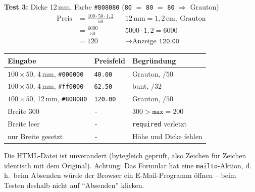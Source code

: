 \documentclass[a4paper,11pt]{article}
\begin{document}
\textbf{Test 3:} Dicke 12\,mm, Farbe \texttt{\#808080} (\texttt{80} $=$ \texttt{80} $=$ \texttt{80} $\Rightarrow$ Grauton)
\begin{align*}
\text{Preis} &= \frac{100 \cdot 50 \cdot 1{,}2}{50} && 12\,\text{mm} = 1{,}2\,\text{cm},\ \text{Grauton}\\
&= \frac{6000}{50} && 5000 \cdot 1{,}2 = 6000\\
&= 120 && \to \text{Anzeige } \texttt{120.00}
\end{align*}

\begin{ergebnis}
\begin{tabular}{@{}lll@{}}
\toprule
Eingabe & Preisfeld & Begründung\\
\midrule
$100 \times 50$, 4\,mm, \texttt{\#000000} & \texttt{40.00}  & Grauton, $/50$\\
$100 \times 50$, 4\,mm, \texttt{\#ff0000} & \texttt{62.50}  & bunt, $/32$\\
$100 \times 50$, 12\,mm, \texttt{\#808080} & \texttt{120.00} & Grauton, $/50$\\
Breite 300                                & \texttt{-}      & $300 > \texttt{max}=200$\\
Breite leer                               & \texttt{-}      & \texttt{required} verletzt\\
nur Breite gesetzt                        & \texttt{-}      & Höhe und Dicke fehlen\\
\bottomrule
\end{tabular}

Die HTML-Datei ist unverändert (bytegleich geprüft, also Zeichen für Zeichen identisch mit dem Original).
Achtung: Das Formular hat eine \texttt{mailto}-Aktion, d.\,h.\ beim Absenden würde der Browser ein E-Mail-Programm
öffnen -- beim Testen deshalb nicht auf "`Absenden"' klicken.
\end{ergebnis}
\end{document}
